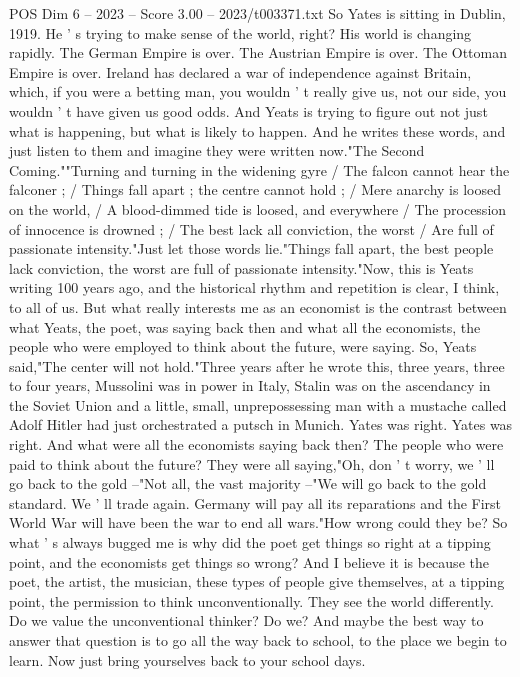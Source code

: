 \begin{textsample}{POS Dim 6 – 2023 – Score 3.00 – 2023/t003371.txt}
So Yates is sitting in Dublin, 1919.
He ' s trying to make sense of the world, right?
His world is changing rapidly.
The German Empire is over.
The Austrian Empire is over.
The Ottoman Empire is over.
Ireland has declared a war of independence against Britain, which, if you were a betting man, you wouldn ' t really give us, not our side, you wouldn ' t have given us good odds.
And Yeats is trying to figure out not just what is happening, but what is likely to happen.
And he writes these words, and just listen to them and imagine they were written now."The Second Coming.""Turning and turning in the widening gyre / The falcon cannot hear the falconer ; / Things fall apart ; the centre cannot hold ; / Mere anarchy is loosed on the world, / A blood-dimmed tide is loosed, and everywhere / The procession of innocence is drowned ; / The best lack all conviction, the worst / Are full of passionate intensity."Just let those words lie."Things fall apart, the best people lack conviction, the worst are full of passionate intensity."Now, this is Yeats writing 100 years ago, and the historical rhythm and repetition is clear, I think, to all of us.
But what really interests me as an economist is the contrast between what Yeats, the poet, was saying back then and what all the economists, the people who were employed to think about the future, were saying.
So, Yeats said,"The center will not hold."Three years after he wrote this, three years, three to four years, Mussolini was in power in Italy, Stalin was on the ascendancy in the Soviet Union and a little, small, unprepossessing man with a mustache called Adolf Hitler had just orchestrated a putsch in Munich.
Yates was right.
Yates was right.
And what were all the economists saying back then?
The people who were paid to think about the future?
They were all saying,"Oh, don ' t worry, we ' ll go back to the gold --"Not all, the vast majority --"We will go back to the gold standard.
We ' ll trade again.
Germany will pay all its reparations and the First World War will have been the war to end all wars."How wrong could they be?
So what ' s always bugged me is why did the poet get things so right at a tipping point, and the economists get things so wrong?
And I believe it is because the poet, the artist, the musician, these types of people give themselves, at a tipping point, the permission to think unconventionally.
They see the world differently.
Do we value the unconventional thinker?
Do we?
And maybe the best way to answer that question is to go all the way back to school, to the place we begin to learn.
Now just bring yourselves back to your school days.

\end{textsample}
